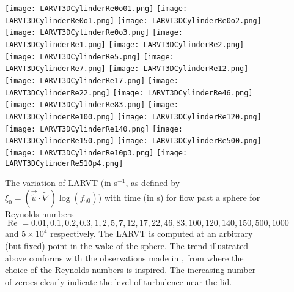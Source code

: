 \documentclass{article}
\begin{document}
\begin{figure}
\texttt{[image: LARVT3DCylinderRe0o01.png]}
\texttt{[image: LARVT3DCylinderRe0o1.png]}
\texttt{[image: LARVT3DCylinderRe0o2.png]}
\texttt{[image: LARVT3DCylinderRe0o3.png]}
\texttt{[image: LARVT3DCylinderRe1.png]}
\texttt{[image: LARVT3DCylinderRe2.png]}
\texttt{[image: LARVT3DCylinderRe5.png]}
\texttt{[image: LARVT3DCylinderRe7.png]}
\texttt{[image: LARVT3DCylinderRe12.png]}
\texttt{[image: LARVT3DCylinderRe17.png]}
\texttt{[image: LARVT3DCylinderRe22.png]}
\texttt{[image: LARVT3DCylinderRe46.png]}
\texttt{[image: LARVT3DCylinderRe83.png]}
\texttt{[image: LARVT3DCylinderRe100.png]}
\texttt{[image: LARVT3DCylinderRe120.png]}
\texttt{[image: LARVT3DCylinderRe140.png]}
\texttt{[image: LARVT3DCylinderRe150.png]}
\texttt{[image: LARVT3DCylinderRe500.png]}
\texttt{[image: LARVT3DCylinderRe10p3.png]}
\texttt{[image: LARVT3DCylinderRe510p4.png]}
\caption{\label{Fig7} The variation of LARVT (in s$^{-1}$, as defined by $\xi_0 = (\vec{\tilde{u}}\cdot\tilde{\nabla})\operatorname{log}(f_{\gamma 0})$) with time (in s) for flow past a sphere for Reynolds numbers $\operatorname{Re} = 0.01, 0.1, 0.2, 0.3, 1, 2, 5, 7, 12, 17, 22, 46, 83, 100, 120, 140, 150, 500, 1000$ and $5\times10^4$ respectively. The LARVT is computed at an arbitrary (but fixed) point in the wake of the sphere. The trend illustrated above conforms with the observations made in \cite{southard}, from where the choice of the Reynolds numbers is inspired. The increasing number of zeroes clearly indicate the level of turbulence near the lid.}
\end{figure}
\end{document}

